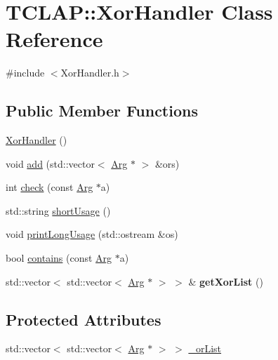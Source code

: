 \hypertarget{class_t_c_l_a_p_1_1_xor_handler}{\section{T\+C\+L\+A\+P\+:\+:Xor\+Handler Class Reference}
\label{class_t_c_l_a_p_1_1_xor_handler}
}


{\ttfamily \#include $<$Xor\+Handler.\+h$>$}

\subsection*{Public Member Functions}
\begin{DoxyCompactItemize}
\item 
\hyperlink{class_t_c_l_a_p_1_1_xor_handler_a195391f50b7fe5eb939c2f6d236f571e}{Xor\+Handler} ()
\item 
void \hyperlink{class_t_c_l_a_p_1_1_xor_handler_a76f156bf36a8aede334801aa242f31b9}{add} (std\+::vector$<$ \hyperlink{class_t_c_l_a_p_1_1_arg}{Arg} $\ast$ $>$ \&ors)
\item 
int \hyperlink{class_t_c_l_a_p_1_1_xor_handler_a3df7722e4c4c5d331de69fc902336b00}{check} (const \hyperlink{class_t_c_l_a_p_1_1_arg}{Arg} $\ast$a)
\item 
std\+::string \hyperlink{class_t_c_l_a_p_1_1_xor_handler_aca185a80e9df6e4250a230fa5aec7891}{short\+Usage} ()
\item 
void \hyperlink{class_t_c_l_a_p_1_1_xor_handler_a257a855934eb343a0fad3c4e5fe5ff57}{print\+Long\+Usage} (std\+::ostream \&os)
\item 
bool \hyperlink{class_t_c_l_a_p_1_1_xor_handler_a1a74fab4667cc591a1e3094c91bc942d}{contains} (const \hyperlink{class_t_c_l_a_p_1_1_arg}{Arg} $\ast$a)
\item 
\hypertarget{class_t_c_l_a_p_1_1_xor_handler_a0e0d95c697d227cc51f82424b8530182}{std\+::vector$<$ std\+::vector$<$ \hyperlink{class_t_c_l_a_p_1_1_arg}{Arg} $\ast$ $>$ $>$ \& {\bfseries get\+Xor\+List} ()}\label{class_t_c_l_a_p_1_1_xor_handler_a0e0d95c697d227cc51f82424b8530182}

\end{DoxyCompactItemize}
\subsection*{Protected Attributes}
\begin{DoxyCompactItemize}
\item 
std\+::vector$<$ std\+::vector$<$ \hyperlink{class_t_c_l_a_p_1_1_arg}{Arg} $\ast$ $>$ $>$ \hyperlink{class_t_c_l_a_p_1_1_xor_handler_a4ebd5b96e23a0ab03bdd431fe622d4e1}{\+\_\+or\+List}
\end{DoxyCompactItemize}


